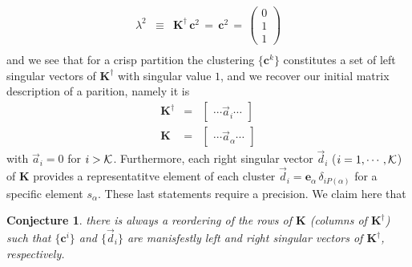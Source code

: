 \documentclass[twocolumn,aps,sort,nofootinbib]{revtex4}
\newtheorem{conjecture}{Conjecture}
\begin{document}
\begin{appendix}
\begin{subequations}
\begin{eqnarray}
\lambda^2 & \equiv & \mathbf{K}^\dagger\,\mathbf{c}^2\,=\,\mathbf{c}^2\,=\,\begin{pmatrix}0\\ 1\\ 1\end{pmatrix} \\
\end{eqnarray}
\end{subequations}
and we see that for a crisp partition the clustering $\{\mathbf{c}^k\}$ constitutes a set of 
left singular vectors of $\mathbf{K}^\dagger$ with singular value $1$, and we recover our
initial matrix description of a parition, namely it is
\begin{subequations}
\begin{eqnarray}
\mathbf{K}^\dagger &= & \begin{bmatrix}\cdots\overrightarrow{a}_i\cdots\end{bmatrix} \\
\mathbf{K}         &= & \begin{bmatrix}\cdots\overrightarrow{a}_\alpha\cdots\end{bmatrix} 
\end{eqnarray} 
\end{subequations}
with $\overrightarrow{a}_i=0$ for $i>{\cal K}$. Furthermore, each right singular vector 
$\overrightarrow{d}_i$ ($i=1,\cdots,{\cal K}$) of $\mathbf{K}$ provides a representatitve element of each
cluster $\overrightarrow{d}_i=\mathbf{e}_\alpha\,\delta_{iP(\alpha)}$ for a specific element $s_\alpha$.
These last statements require a precision. We claim here that 
\begin{conjecture}
there is always a reordering
of the rows of $\mathbf{K}$ (columns of $\mathbf{K}^\dagger$) such that $\{\mathbf{c}^i\}$ and 
$\{\overrightarrow{d}_i\}$ 
are manisfestly left and right singular vectors of $\mathbf{K}^\dagger$, respectively.
\end{conjecture}


\end{appendix}
\end{document}
